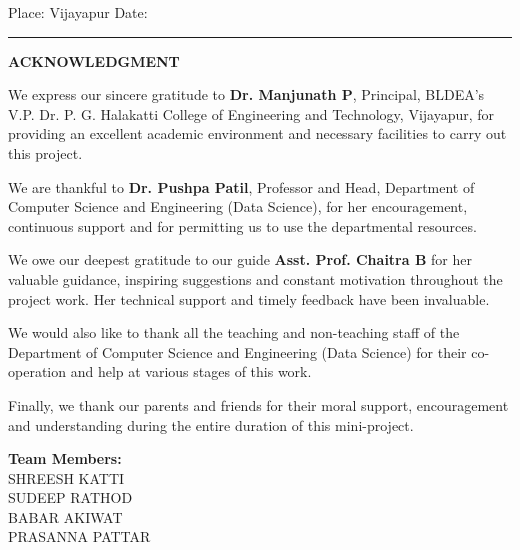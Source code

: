 \documentclass[12pt,a4paper]{report}
\begin{document}
\vfill

\noindent
Place: Vijayapur \hfill Date:\ \rule{3cm}{0.4pt}


\clearpage
{}
\thispagestyle{plain}
\begin{center}
{\large\bfseries ACKNOWLEDGMENT}\\[0.8cm]
\end{center}

\noindent
We express our sincere gratitude to \textbf{Dr. Manjunath P}, Principal, BLDEA's V.P. Dr. P. G. Halakatti College of Engineering and Technology, Vijayapur, for providing an excellent academic environment and necessary facilities to carry out this project.

\medskip

\noindent
We are thankful to \textbf{Dr. Pushpa Patil}, Professor and Head, Department of Computer Science and Engineering (Data Science), for her encouragement, continuous support and for permitting us to use the departmental resources.

\medskip

\noindent
We owe our deepest gratitude to our guide \textbf{Asst. Prof. Chaitra B} for her valuable guidance, inspiring suggestions and constant motivation throughout the project work. Her technical support and timely feedback have been invaluable.

\medskip

\noindent
We would also like to thank all the teaching and non-teaching staff of the Department of Computer Science and Engineering (Data Science) for their co-operation and help at various stages of this work.

\medskip

\noindent
Finally, we thank our parents and friends for their moral support, encouragement and understanding during the entire duration of this mini-project.

\vspace{1.5cm}

\noindent
\textbf{Team Members:}\\[0.3cm]
SHREESH KATTI\\
SUDEEP RATHOD\\
BABAR AKIWAT\\
PRASANNA PATTAR

\end{document}
